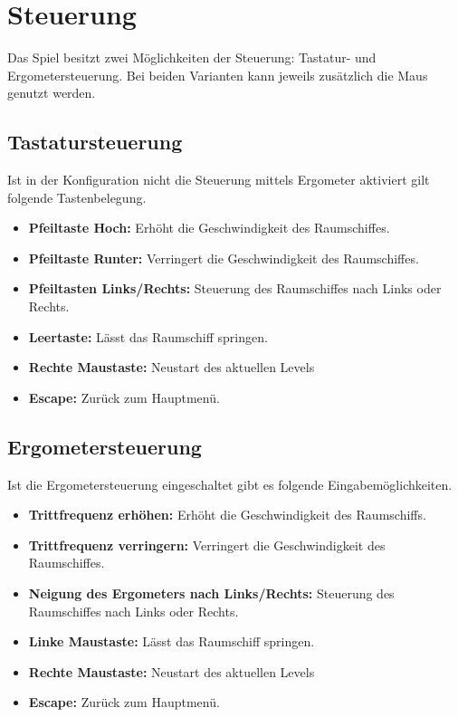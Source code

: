 \section{Steuerung}
Das Spiel besitzt zwei Möglichkeiten der Steuerung: Tastatur- und Ergometersteuerung. Bei beiden Varianten kann jeweils zusätzlich die Maus genutzt werden. \\

\subsection{Tastatursteuerung}
Ist in der Konfiguration nicht die Steuerung mittels Ergometer aktiviert gilt folgende Tastenbelegung.

\begin{itemize}
  \item \textbf{Pfeiltaste Hoch:} Erhöht die Geschwindigkeit des Raumschiffes.
  \item \textbf{Pfeiltaste Runter:} Verringert die Geschwindigkeit des Raumschiffes.
  \item \textbf{Pfeiltasten Links/Rechts:} Steuerung des Raumschiffes nach Links oder Rechts.
  \item \textbf{Leertaste:} Lässt das Raumschiff springen.
  \item \textbf{Rechte Maustaste:} Neustart des aktuellen Levels
  \item \textbf{Escape:} Zurück zum Hauptmenü.
\end{itemize}

\subsection{Ergometersteuerung}
Ist die Ergometersteuerung eingeschaltet gibt es folgende Eingabemöglichkeiten.

\begin{itemize}
  \item \textbf{Trittfrequenz erhöhen:} Erhöht die Geschwindigkeit des Raumschiffs.
  \item \textbf{Trittfrequenz verringern:} Verringert die Geschwindigkeit des Raumschiffes.
  \item \textbf{Neigung des Ergometers nach Links/Rechts:} Steuerung des Raumschiffes nach Links oder Rechts.
  \item \textbf{Linke Maustaste:} Lässt das Raumschiff springen.
  \item \textbf{Rechte Maustaste:} Neustart des aktuellen Levels
  \item \textbf{Escape:} Zurück zum Hauptmenü.
\end{itemize}


